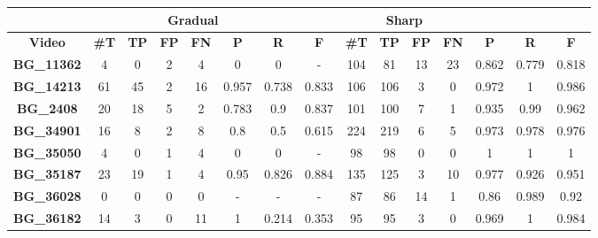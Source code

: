 \documentclass[journal]{IEEEtran}
\begin{document}
\begin{table*}[h]
\centering

\begin{tabular}{|c|c|c|c|c|c|c|c|c|c|c|c|c|c|c|}
\hline
 & \multicolumn{6}{c|}{\textbf{Gradual}} & \multicolumn{6}{c|}{\textbf{Sharp}}  \\ \hline
\textbf{Video} & \textbf{\#T} & \textbf{TP} & \textbf{FP} & \textbf{FN} & \textbf{P} & \textbf{R} & \textbf{F} & \textbf{\#T} & \textbf{TP} & \textbf{FP} & \textbf{FN} & \textbf{P} & \textbf{R} & \textbf{F} \\ \hline
\textbf{BG\_11362} & 4             & 0           & 2           & 4           & 0          & 0          & -        & 104           & 81          & 13          & 23          & 0.862      & 0.779      & 0.818      \\ \hline
\textbf{BG\_14213} & 61            & 45          & 2           & 16          & 0.957      & 0.738      & 0.833      & 106           & 106         & 3           & 0           & 0.972      & 1          & 0.986      \\ \hline
\textbf{BG\_2408}  & 20            & 18          & 5           & 2           & 0.783      & 0.9        & 0.837      & 101           & 100         & 7           & 1           & 0.935      & 0.99       & 0.962      \\ \hline
\textbf{BG\_34901} & 16            & 8           & 2           & 8           & 0.8        & 0.5        & 0.615      & 224           & 219         & 6           & 5           & 0.973      & 0.978      & 0.976      \\ \hline
\textbf{BG\_35050} & 4             & 0           & 1           & 4           & 0          & 0          & -        & 98            & 98          & 0           & 0           & 1          & 1          & 1          \\ \hline
\textbf{BG\_35187} & 23            & 19          & 1           & 4           & 0.95       & 0.826      & 0.884      & 135           & 125         & 3           & 10          & 0.977      & 0.926      & 0.951      \\ \hline
\textbf{BG\_36028} & 0             & 0           & 0           & 0           & -        & -        & -        & 87            & 86          & 14          & 1           & 0.86       & 0.989      & 0.92       \\ \hline
\textbf{BG\_36182} & 14            & 3           & 0           & 11          & 1          & 0.214      & 0.353      & 95            & 95          & 3           & 0           & 0.969      & 1          & 0.984      \\ \hline

\end{tabular}
\end{table*}
\end{document}
